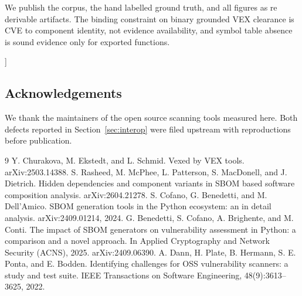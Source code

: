 \documentclass[10pt,twocolumn]{article}
\begin{document}
\begin{center}
\begin{minipage}{0.86\textwidth}
We publish the corpus, the hand labelled ground truth, and all figures as re derivable artifacts. The binding constraint on binary grounded VEX clearance is CVE to component identity, not evidence availability, and symbol table absence is sound evidence only for exported functions.
\normalsize
\end{minipage}\end{center}
\vspace{1em}]

\renewcommand{\thefootnote}{}
\renewcommand{\thefootnote}{\arabic{footnote}}


\subsection*{Acknowledgements}
We thank the maintainers of the open source scanning tools measured here. Both defects reported in Section~\ref{sec:interop} were filed upstream with reproductions before publication.
\begin{thebibliography}{9}
 Y. Churakova, M. Ekstedt, and L. Schmid. Vexed by VEX tools. arXiv:2503.14388.
 S. Rasheed, M. McPhee, L. Patterson, S. MacDonell, and J. Dietrich. Hidden dependencies and component variants in SBOM based software composition analysis. arXiv:2604.21278.
 S. Cofano, G. Benedetti, and M. Dell'Amico. SBOM generation tools in the Python ecosystem: an in detail analysis. arXiv:2409.01214, 2024.
 G. Benedetti, S. Cofano, A. Brighente, and M. Conti. The impact of SBOM generators on vulnerability assessment in Python: a comparison and a novel approach. In Applied Cryptography and Network Security (ACNS), 2025. arXiv:2409.06390.
 A. Dann, H. Plate, B. Hermann, S. E. Ponta, and E. Bodden. Identifying challenges for OSS vulnerability scanners: a study and test suite. IEEE Transactions on Software Engineering, 48(9):3613--3625, 2022.
\end{thebibliography}
\end{document}
